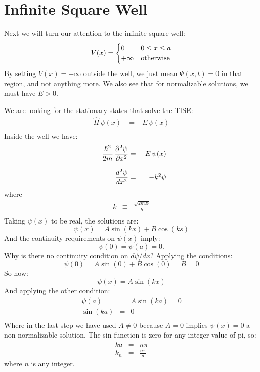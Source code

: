 \documentclass[12pt]{book}
\begin{document}
\section{Infinite Square Well}

Next we will turn our attention to the infinite square well:
\begin{equation}
V(x) = 
\begin{cases}    
   0 & 0 \leq x \leq a \\
   +\infty & {\rm otherwise} \\
\end{cases}   
\end{equation}
By setting $V(x) = +\infty$ outside the well, we just mean $\Psi(x,t)=0$ in that region, and not anything more.  We also see that for normalizable solutions, we must have $E>0$.

We are looking for the stationary states that solve the TISE:
\begin{eqnarray*}
\hat{H} \, \psi(x) \; &=& \; E \, \psi(x) \\
\end{eqnarray*}
Inside the well we have:
\begin{eqnarray*}
-\frac{\hbar^2}{2m}\,\frac{\partial^2\psi}{\partial x^2} &=& \; E \, \psi(x) \\[8pt]
 \frac{d^2 \psi}{dx^2}  &=& -k^2 \psi \\
\end{eqnarray*}
where
\begin{eqnarray*}
k &\equiv& \frac{\sqrt{2mE}}{\hbar} \\
\end{eqnarray*}
Taking $\psi(x)$ to be real, the solutions are:
\begin{equation*}
\psi(x) = A \sin(kx) + B \cos(ks)
\end{equation*}
And the continuity requirements on $\psi(x)$ imply:
\begin{equation*}
\psi(0) = \psi(a) = 0.
\end{equation*}
Why is there no continuity condition on $d\psi/dx$?  Applying the conditions:
\begin{equation*}
\psi(0) = A \sin(0) + B \cos(0) = B = 0
\end{equation*}
So now:
\begin{equation*}
\psi(x) = A \sin(kx) 
\end{equation*}
And applying the other condition:
\begin{eqnarray*}
\psi(a)  &=& A \sin(ka) = 0 \\
\sin(ka) &=& 0 \\
\end{eqnarray*}
Where in the last step we have used $A \neq 0$ because $A=0$ implies $\psi(x)=0$ a non-normalizable solution.  The sin function is zero for any integer value of pi, so:
\begin{eqnarray*}
ka &=& n \pi \\[12pt]
k_n&=&\frac{n\pi}{a}
\end{eqnarray*}
where $n$ is any integer.  
\end{document}
